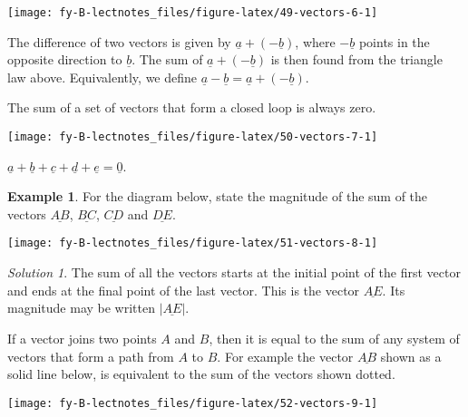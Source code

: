 \documentclass[
  11pt,
  oneside]{book}
\newcommand{\slide}{}
\theoremstyle{definition}
\theoremstyle{definition}
\newtheorem{example}{Example}[chapter]
\theoremstyle{definition}
\theoremstyle{definition}
\theoremstyle{remark}
\newtheorem*{solution}{Solution}
\begin{document}
\begin{center}\texttt{[image: fy-B-lectnotes\_files/figure-latex/49-vectors-6-1]} \end{center}

The difference of two vectors is given by \(\underline a + (-\underline b)\), where \(-\underline b\) points in the opposite direction to \(\underline b\). The sum of \(\underline a + (-\underline b)\) is then found from the triangle law above. Equivalently, we define \(\underline a-\underline b = \underline a + (-\underline b)\).

\slide

The sum of a set of vectors that form a closed loop is always zero.

\begin{center}\texttt{[image: fy-B-lectnotes\_files/figure-latex/50-vectors-7-1]} \end{center}

\(\underline a + \underline b + \underline c + \underline d + \underline e = \underline 0\).

\slide

\begin{example}

For the diagram below, state the magnitude of the sum of the vectors \(\underline{AB}\), \(\underline{BC}\), \(\underline{CD}\) and \(\underline{DE}\).

\begin{center}\texttt{[image: fy-B-lectnotes\_files/figure-latex/51-vectors-8-1]} \end{center}

\end{example}

\begin{solution}
The sum of all the vectors starts at the initial point of the first vector and ends at the final point of the last vector. This is the vector \(\underline{AE}\). Its magnitude may be written \(|\underline{AE}|\).
\end{solution}

\slide

If a vector joins two points \(A\) and \(B\), then it is equal to the sum of any system of vectors that form a path from \(A\) to \(B\). For example the vector \(\underline{AB}\) shown as a solid line below, is equivalent to the sum of the vectors shown dotted.

\begin{center}\texttt{[image: fy-B-lectnotes\_files/figure-latex/52-vectors-9-1]} \end{center}
\end{document}
